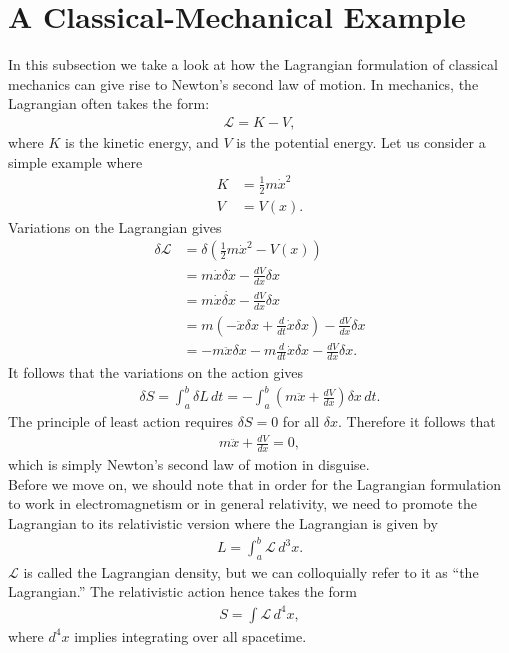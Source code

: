 \documentclass{book}
\numberwithin{equation}{section}
\theoremstyle{definition}
\begin{document}
\section{A Classical-Mechanical Example}
In this subsection we take a look at how the Lagrangian formulation of classical mechanics can give rise to Newton's second law of motion. In mechanics, the Lagrangian often takes the form:
\begin{align}
\mathcal{L} = K - V,
\end{align}
where $K$ is the kinetic energy, and $V$ is the potential energy. Let us consider a simple example where
\begin{align}
K &= \frac{1}{2}m\dot{x}^2\\
V &= V(x).
\end{align}
Variations on the Lagrangian gives
\begin{align}
\delta \mathcal{L} &= \delta\left( \frac{1}{2}m\dot{x}^2 - V(x) \right)\\
&= m\dot{x}\delta \dot{x} - \frac{dV}{dx}\delta x\\
&= m\dot{x}\dot{\delta x} - \frac{dV}{dx}\delta x\\
&= m \left( -\ddot{x}\delta x + \frac{d}{dt}\dot{x}\delta x \right) - \frac{dV}{dx}\delta x\\
&= -m\ddot{x}\delta x - m\frac{d}{dt}\dot{x}\delta x - \frac{dV}{dx}\delta x. 
\end{align}
It follows that the variations on the action gives
\begin{align}
\delta S = \int_{a}^{b}\delta L \,dt = -\int_a^b\left( m\ddot{x} + \frac{dV}{dx} \right)\delta x\,dt.
\end{align}
The principle of least action requires $\delta S = 0$ for all $\delta x$. Therefore it follows that
\begin{align}
m\ddot{x} + \frac{dV}{dx} = 0,
\end{align}
which is simply Newton's second law of motion in disguise. \\

Before we move on, we should note that in order for the Lagrangian formulation to work in electromagnetism or in general relativity, we need to promote the Lagrangian to its relativistic version where the Lagrangian is given by
\begin{align}
L = \int_a^b\mathcal{L}\,d^3x.
\end{align}
$\mathcal{L}$ is called the Lagrangian density, but we can colloquially refer to it as ``the Lagrangian.'' The relativistic action hence takes the form
\begin{align}
S = \int \mathcal{L}\,d^4x,
\end{align}
where $d^4x$ implies integrating over all spacetime.
\end{document}
